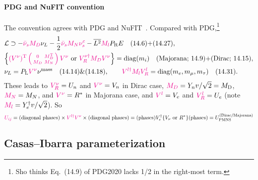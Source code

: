 \documentclass[CheatSheet]{subfiles}
\newcommand\MD[1][]{M_{\mathrm{D}#1}}
\begin{document}
\paragraph{PDG and NuFIT convention} The convention agrees with PDG \cite[\S14]{PDG2020} and NuFIT~\cite[v5.0]{NUFIT}. Compared with PDG,\footnote{Sho thinks Eq.~(14.9) of PDG2020 lacks 1/2 in the right-most term.}
\begin{align*}
& \mathcal L
\supset
 -{\color{magenta}\bar\nu_s} {\color{magenta}M_D} \nu_L
 -\frac12{\color{magenta}\bar\nu_s} {\color{magenta}M_N} {\color{magenta}\nu^c_s}
 -\overline{L^2}{\color{magenta}M_l}P_{\mathrm{R}} E\quad\text{(14.6)+(14.27)},\\
&
\Bigl\{{\color{magenta}(V^{\nu})^{\mathrm{T}} \left(\begin{smallmatrix}0&M_D^{\mathrm{T}} \\ M_D &M_N\end{smallmatrix}\right) V^\nu}\text{~or~}{\color{magenta}V_R^{\nu\dagger}M_D V^\nu}\Bigr\}=\operatorname{\mathrm{diag}}(m_i)\quad
\text{(Majorana; 14.9)+(Dirac; 14.15)},\\
&\nu_{L}=P_{\mathrm{L}}{\color{magenta}V^\nu}\nu^{\text{mass}}\quad\text{(14.14)\&(14.18)},\qquad
{\color{magenta}V^{l\dagger}M_l V^l_R}=\operatorname{\mathrm{diag}}(m_e,m_\mu,m_\tau)\quad\text{(14.31)}.
\end{align*}
These leads to ${\color{magenta}V^\nu_R}=U_n$ and ${\color{magenta}V^\nu}=V_n$ in Dirac case, $\CONV{M_D} = \Yn v/\sqrt2=\MD$, ${\color{magenta}M_N}=M_N$, and ${\color{magenta}V^\nu}=R^*$ in Majorana case, and ${\color{magenta}V^{l}}=V_e$ and ${\color{magenta}V_R^l}=U_e$ (note ${\color{magenta}M_l}=Y_e^\dagger v/\sqrt{2}$).
So
\begin{equation*}
 {\color{magenta}U_{ij}} = \text{(diagonal phases)}\times{\color{magenta}V^{l\dagger}}{\color{magenta}V^{\nu}}\times\text{(diagonal phases)}=\text{(phases)}V_e^\dagger \{V_\nu\text{~or~}R^*\}\text{(phases)}= U_{\mathrm{PMNS}}^{\text{(Dirac/Majorana)}}
\end{equation*}



\subsection{Casas--Ibarra parameterization}
\end{document}
